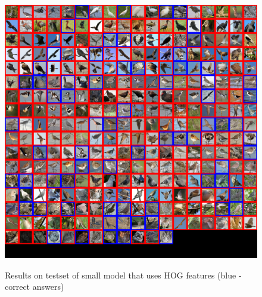 \documentclass[a4paper]{article}
\begin{document}
\begin{figure}[h]
    \caption[]{Results on testset of small model that uses HOG features (blue - correct answers)}
    \centering
    \includegraphics[page=2,width=1.0\textwidth]{eval.png}
    \label{fig:eval}
\end{figure}


\end{document}
